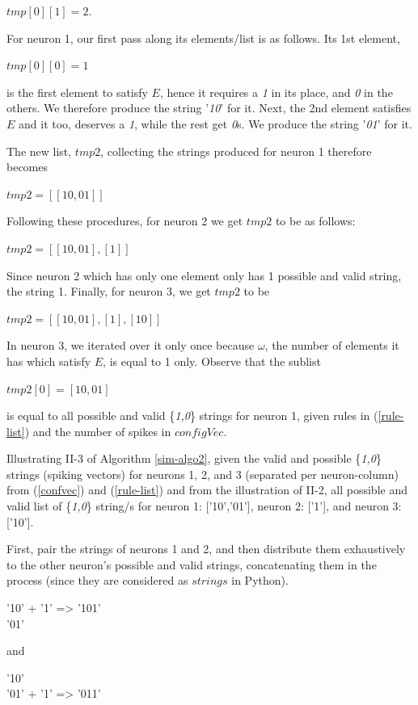 \documentclass{acm_proc_article-sp}
\begin{document}
		$tmp[ 0 ] [ 1 ] = 2.$ 

For neuron 1, our first pass along its elements/list is as follows. Its 1st element,

		$tmp[ 0 ][ 0 ] = 1$

is the first element to satisfy $E$, hence it requires a \textit{1} in its place, and \textit{0} in the others. We therefore produce the string	'\textit{10}' for it. Next, the 2nd element satisfies $E$ and it too, deserves a \textit{1}, while the rest get \textit{0}s. We produce the string '\textit{01}' for it. 

The new list, $tmp2$, collecting the strings produced for neuron 1 therefore becomes

		$tmp2 = [ [ 10, 01 ] ] $

Following these procedures, for neuron 2 we get $tmp2$ to be as follows: 

		$tmp2 = [ [ 10, 01 ], [ 1 ] ]$ 

Since neuron 2 which has only one element only has 1 possible and valid string, the string 1. 
Finally, for neuron 3, we get $tmp2$ to be 

		$tmp2 = [ [ 10, 01 ], [ 1 ], [ 10 ] ] $

In neuron 3, we iterated over it only once because $\omega$, the number of elements it has which satisfy $E$, is equal to 1 only. 
Observe that the sublist 

		$tmp2[ 0 ] = [ 10, 01 ]$ 

is equal to all possible and valid \{\textit{1,0}\} strings for neuron 1, given rules in (\ref{rule-list}) and the number of spikes in $configVec$. 

Illustrating II-3 of Algorithm \ref{sim-algo2}, given the valid and
possible \{\textit{1,0}\} strings (spiking vectors) for neurons 1, 2, and 3 (separated per neuron-column) from (\ref{confvec}) and (\ref{rule-list}) and from the illustration of II-2, all possible and valid list of \{\textit{1,0}\} string/s for neuron 1: ['10','01'], neuron 2: ['1'], and neuron 3: ['10'].

First, pair the strings of neurons 1 and 2, and then distribute them exhaustively to the other neuron's possible and valid strings, concatenating them in the process (since they are considered as $strings$ in Python). 

'10'  +	'1' => '101'\\
'01' 

and 

'10' \\
'01'  +	'1' => '011'
\end{document}

